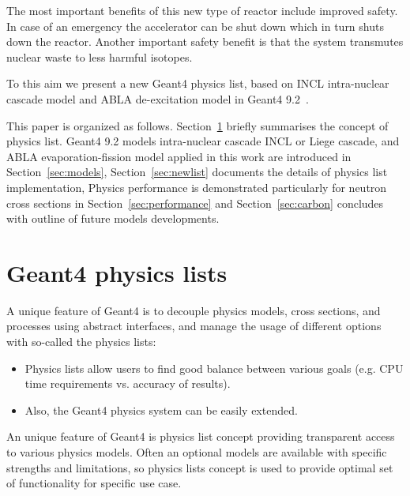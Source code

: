 \documentclass[a4paper]{jpconf}
\begin{document}
The most important benefits of
this new type of reactor include improved safety. In case of an
emergency the accelerator can be shut down which in turn shuts down
the reactor. Another important safety benefit is that the system
transmutes nuclear waste to less harmful isotopes.


To this aim we present a new Geant4 physics list, 
based on INCL \cite{incl} intra-nuclear cascade model and ABLA de-excitation model in Geant4 9.2~\cite{g4}. 




This paper is organized as follows.
Section~\ref{sec:list} briefly summarises the concept of physics list.
Geant4 9.2 models intra-nuclear cascade INCL or Liege cascade, and ABLA evaporation-fission model
applied in this work are introduced in Section~\ref{sec:models},
Section~\ref{sec:newlist} documents the details of physics list implementation, 
Physics performance is demonstrated particularly for 
neutron  cross sections in Section~\ref{sec:performance} and
Section~\ref{sec:carbon} concludes with outline of future models developments.


\section{Geant4 physics lists}\label{sec:list}

A unique feature of Geant4 is to  
decouple physics models, cross sections, and processes
using abstract interfaces, and manage the usage of different options with so-called the physics lists:
\begin{itemize}
\item Physics lists allow users to find good balance between various goals (e.g. CPU
time requirements vs. accuracy of results).
\item Also, the Geant4 physics system can be easily extended.
\end{itemize}

An unique feature of Geant4 is physics list concept providing transparent access 
to various physics models. 
Often an optional models are available with specific strengths and limitations, 
so physics lists concept is used to
provide optimal set of functionality for specific use case.
\end{document}
